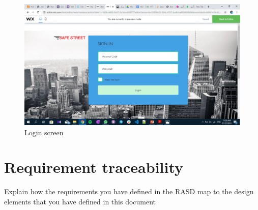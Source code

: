\documentclass{article}
\begin{document}
		\begin{figure}[h]
			\includegraphics[width=\linewidth]{images/log_in.png}
			\caption{Login screen}
		\end{figure}
\FloatBarrier
\section{Requirement traceability}	Explain	how	the	requirements	you	have	defined	in	the	RASD	
map	to the	design	elements	that	you	have	defined	in	this	document
\end{document}
